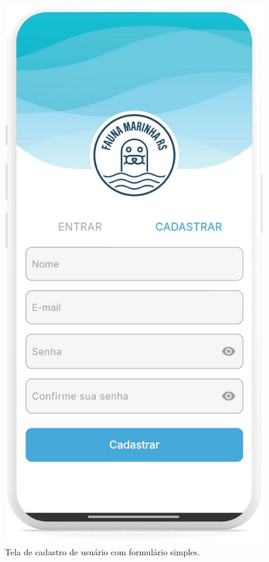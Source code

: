 \begin{figure}[H]
\begin{minipage}[t]{0.48\textwidth}
        \includegraphics[height=0.72\textheight]{imagens/sistema/device_frame/cadastro.png}
        \caption{Tela de cadastro de usuário com formulário simples.}
        \label{fig:cadastro}
    \end{minipage}

\end{figure}
